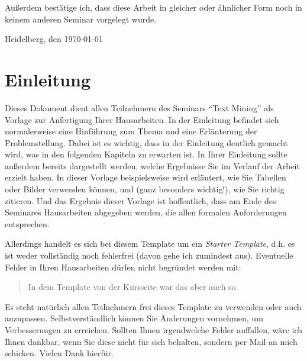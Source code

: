 \documentclass[
     11pt,         %
     a4paper,      %
     oneside,
     ]{article}
\begin{document}
Außerdem bestätige ich, dass diese Arbeit in gleicher oder ähnlicher Form noch in keinem anderen Seminar vorgelegt wurde.
\vspace*{50pt}

Heidelberg, den \today \hspace{2cm} \underline{\phantom{Platz für die Unterschrift}}
\newpage



\tableofcontents
\newpage





\section{Einleitung}\label{sec:einleitung}
Dieses Dokument dient allen Teilnehmern des Seminars ``Text Mining'' als Vorlage zur Anfertigung Ihrer Hausarbeiten. In der Einleitung befindet sich normalerweise eine Hinführung zum Thema und eine Erläuterung der Problemstellung. Dabei ist es wichtig, dass in der Einleitung deutlich gemacht wird, was in den folgenden Kapiteln zu erwarten ist. In Ihrer Einleitung sollte außerdem bereits dargestellt werden, welche Ergebnisse Sie im Verlauf der Arbeit erzielt haben. In dieser Vorlage beispielsweise wird erläutert, wie Sie Tabellen oder Bilder verwenden können, und (ganz besonders wichtig!), wie Sie richtig zitieren. Und das Ergebnis dieser Vorlage ist hoffentlich, dass am Ende des Seminares Hausarbeiten abgegeben werden, die allen formalen Anforderungen entsprechen. 

Allerdings handelt es sich bei diesem Template um ein \emph{Starter Template}, d.h. es ist weder vollständig noch fehlerfrei (davon gehe ich zumindest aus). Eventuelle Fehler in Ihren Hausarbeiten dürfen nicht begründet werden mit:
\begin{quotation}
In dem Template von der Kursseite war das aber auch so.
\end{quotation}

Es steht natürlich allen Teilnehmern frei dieses Template zu verwenden oder auch anzupassen. Selbstverständlich können Sie Änderungen vornehmen, um Verbesserungen zu erreichen. Sollten Ihnen irgendwelche Fehler auffallen, wäre ich Ihnen dankbar, wenn Sie diese nicht für sich behalten, sondern per Mail an mich schicken. Vielen Dank hierfür.
\end{document}
